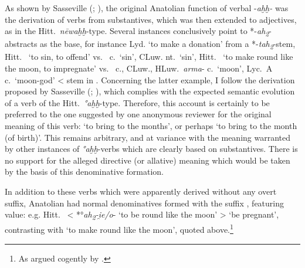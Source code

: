 \documentclass[output=paper,colorlinks,citecolor=brown]{langscibook}
\begin{document}
As shown by Sasseville (\citeyear[287--292]{Sasseville2014}; \citeyear[69--70]{Sasseville2021}), the original Anatolian function of verbal -\textit{aḫḫ-} was the derivation of verbs from substantives, which was then extended to adjectives, as in the Hitt.\ \textit{nēwaḫḫ}-type. Several instances conclusively point to *-\textit{ah\textsubscript{2}}-abstracts as the base, for instance Lyd.  ‘to make a donation’ from a *-\textit{tah\textsubscript{2}}-stem, Hitt.\  ‘to sin, to offend’ vs.\  c.\ ‘sin’, CLuw.  nt.\ ‘sin’, Hitt.\  ‘to make round like the moon, to impregnate’ vs.\  c., CLuw., HLuw.\ \textit{arma}- c.\  ‘moon’,   Lyc.\  A  c.\ ‘moon-god’ < stem in . Concerning the latter example, I follow the derivation proposed by Sasseville (\citeyear[282--284]{Sasseville2014}; \citeyear[69--71]{Sasseville2021}), which  complies with the expected semantic evolution of a verb of the  Hitt.\ \textit{°aḫḫ}-type. Therefore, this account is certainly to be preferred to the one suggested by one anonymous reviewer for the original meaning of this verb: ‘to bring to the months’, or perhaps ‘to bring to the month (of birth)’. This remains arbitrary, and at variance with the  meaning warranted by other instances of \textit{°aḫḫ}-verbs which are clearly based on substantives. There is no support for the alleged directive (or allative) meaning which would be taken by the basis of this denominative formation. 

In addition to these  verbs which were apparently derived without any overt suffix, Anatolian had normal denominatives formed with the suffix , featuring  value: e.g. Hitt.\  < *°\textit{ah\textsubscript{2}-i̯e/o}-  ‘to be round like the moon’ > ‘be pregnant’, contrasting with  ‘to make round like the moon’, quoted above.\footnote{As argued cogently by \citet[287--288]{Sasseville2015}.}  
\end{document}
